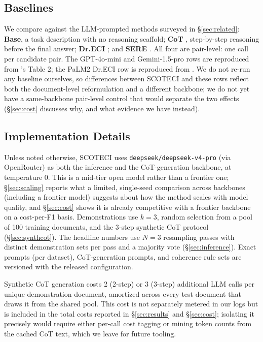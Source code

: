 \documentclass[11pt]{article}
\newcommand{\method}{SCOTECI}
\begin{document}
\subsection{Baselines}
We compare against the LLM-prompted methods surveyed in \S\ref{sec:related}:
\textbf{Base}, a task description with no reasoning scaffold; \textbf{CoT}
\citep{wei2022chain}, step-by-step reasoning before the final answer;
\textbf{Dr.ECI} \citep{cai2025dreci}; and \textbf{SERE} \citep{hao2026sere}. All
four are pair-level: one call per candidate pair. The GPT-4o-mini and
Gemini-1.5-pro rows are reproduced from \citet{hao2026sere}'s Table 2; the PaLM2
Dr.ECI row is reproduced from \citet{cai2025dreci}. We do not re-run any baseline
ourselves, so differences between \method{} and these rows reflect both the
document-level reformulation and a different backbone; we do not yet have a
same-backbone pair-level control that would separate the two effects
(\S\ref{sec:cost} discusses why, and what evidence we have instead).

\subsection{Implementation Details}
Unless noted otherwise, \method{} uses \texttt{deepseek/deepseek-v4-pro} (via
OpenRouter) as both the inference and the CoT-generation backbone, at temperature
0. This is a mid-tier open model rather than a frontier one; \S\ref{sec:scaling}
reports what a limited, single-seed comparison across backbones (including a
frontier model) suggests about how the method scales with model quality, and
\S\ref{sec:cost} shows it is already competitive with a frontier backbone on a
cost-per-F1 basis. Demonstrations use $k=3$, random selection from a pool of 100
training documents, and the 3-step synthetic CoT protocol (\S\ref{sec:synthcot}).
The headline numbers use $N=3$ resampling passes with distinct demonstration sets
per pass and a majority vote (\S\ref{sec:inference}). Exact prompts (per dataset),
CoT-generation prompts, and coherence rule sets are versioned with the released
configuration.

Synthetic CoT generation costs 2 (2-step) or 3 (3-step) additional LLM calls per
unique demonstration document, amortized across every test document that draws it
from the shared pool. This cost is not separately metered in our logs but is
included in the total costs reported in \S\ref{sec:results} and \S\ref{sec:cost};
isolating it precisely would require either per-call cost tagging or mining token
counts from the cached CoT text, which we leave for future tooling.
\end{document}
